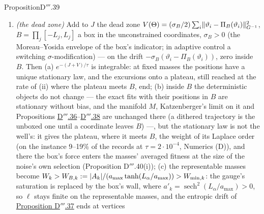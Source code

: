 \begin{thm}{Proposition}{D$'''$.39}
\begin{enumerate}[label=\textup{(\roman*)}]
    coordinate's force vanishes ($\partial J/\partial\alpha_k = a'_k\partial J/\partial a_k$, $a'_k\to0$): approximate
    fits with saturated coordinates form plateaus on which the saturated coordinates diffuse without drift. The exact
    fit's well holds the positions for a time $e^{\Delta J_D/\tau + o(1/\tau)}$ (Freidlin--Wentzell), $\Delta J_D$ the
    lowest energy above the exact fit on the boundary of a part $D$ of its basin that excludes the plateaus; after that
    the positions spend a growing fraction of the time on the plateaus, their fit error at the plateau's level and the
    saturated amplitudes' gain $a'_k\to0$. On the instance the way out is a monotone climb, without a saddle, of the
    widths and amplitudes to a plateau $\Delta J\approx7.7\tau$ ($\tau = 10^{-4}$) above the exact fit.
  \item \emph{(the dead zone)} Add to $J$ the dead zone
    $V(\Theta) = (\sigma_B/2)\sum_i\lVert \vartheta_i - \Pi_B(\vartheta_i)\rVert^2_{G^{-1}}$, $B = \prod_j[-L_j,L_j]$ a box in
    the unconstrained coordinates, $\sigma_B > 0$ (the Moreau--Yosida envelope of the box's indicator; in adaptive
    control a switching $\sigma$-modification) --- on the drift $-\sigma_B(\vartheta_i - \Pi_B(\vartheta_i))$, zero
    inside $B$. Then (a) $e^{-(J+V)/\tau}$ is integrable: at fixed masses the positions have a unique stationary law,
    and the excursions onto a plateau, still reached at the rate of (ii) where the plateau meets $B$, end; (b) inside
    $B$ the deterministic objects do not change --- the exact fits with their positions in $B$ are stationary without
    bias, and the manifold $M$, Katzenberger's limit on it and Propositions
    \hyperref[res:thmDppp:36]{D$'''$.36}--\hyperref[res:thmDppp:38]{D$'''$.38} are unchanged there (a dithered
    trajectory is the unboxed one until a coordinate leaves $B$) ---, but the stationary law is not the well's: it gives
    the plateau, where it meets $B$, the weight of its Laplace order (on the instance 9--19\% of the records at
    $\tau = 2\cdot10^{-4}$, Numerics (D)), and there the box's force enters the masses' averaged fitness at the size of
    the noise's own selection (Proposition D$'''$.40(i)); (c) the representable masses become
    $W_k > W_{B,k} := \lvert A_k\rvert/(a_{\max}\tanh(L_\alpha/a_{\max})) > W_{\min,k}$: the gauge's saturation is replaced by
    the box's wall, where $a'_k = \operatorname{sech}^2(L_\alpha/a_{\max}) > 0$, so $\ell$ stays finite on the
    representable masses, and the entropic drift of \hyperref[res:thmDppp:37]{Proposition D$'''$.37} ends at vertices

\end{enumerate}
\end{thm}

